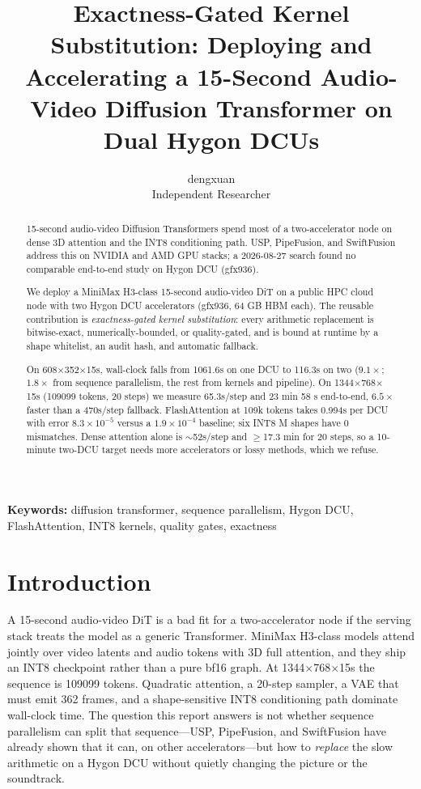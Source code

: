 \documentclass[11pt]{article}
\title{Exactness-Gated Kernel Substitution: Deploying and Accelerating a 15-Second Audio-Video Diffusion Transformer on Dual Hygon DCUs}
\author{dengxuan\\Independent Researcher}
\date{}
\begin{document}
\maketitle

\begin{abstract}
15-second audio-video Diffusion Transformers spend most of a two-accelerator node on dense 3D attention and the INT8 conditioning path. USP, PipeFusion, and SwiftFusion address this on NVIDIA and AMD GPU stacks; a 2026-08-27 search found no comparable end-to-end study on Hygon DCU (gfx936).

We deploy a MiniMax H3-class 15-second audio-video DiT on a public HPC cloud node with two Hygon DCU accelerators (gfx936, 64 GB HBM each). The reusable contribution is \emph{exactness-gated kernel substitution}: every arithmetic replacement is bitwise-exact, numerically-bounded, or quality-gated, and is bound at runtime by a shape whitelist, an audit hash, and automatic fallback.

On 608$\times$352$\times$15s, wall-clock falls from 1061.6s on one DCU to 116.3s on two ($9.1\times$; $1.8\times$ from sequence parallelism, the rest from kernels and pipeline). On 1344$\times$768$\times$15s (109099 tokens, 20 steps) we measure 65.3s/step and 23 min 58 s end-to-end, $6.5\times$ faster than a 470s/step fallback. FlashAttention at 109k tokens takes 0.994s per DCU with error $8.3\times 10^{-5}$ versus a $1.9\times 10^{-4}$ baseline; six INT8 M shapes have 0 mismatches. Dense attention alone is $\sim$52s/step and $\geq$17.3 min for 20 steps, so a 10-minute two-DCU target needs more accelerators or lossy methods, which we refuse.
\end{abstract}

\noindent\textbf{Keywords:} diffusion transformer, sequence parallelism, Hygon DCU, FlashAttention, INT8 kernels, quality gates, exactness

\section{Introduction}
\label{sec:intro}

A 15-second audio-video DiT is a bad fit for a two-accelerator node if the serving stack treats the model as a generic Transformer. MiniMax H3-class models attend jointly over video latents and audio tokens with 3D full attention, and they ship an INT8 checkpoint rather than a pure bf16 graph. At 1344$\times$768$\times$15s the sequence is 109099 tokens. Quadratic attention, a 20-step sampler, a VAE that must emit 362 frames, and a shape-sensitive INT8 conditioning path dominate wall-clock time. The question this report answers is not whether sequence parallelism can split that sequence---USP, PipeFusion, and SwiftFusion have already shown that it can, on other accelerators---but how to \emph{replace} the slow arithmetic on a Hygon DCU without quietly changing the picture or the soundtrack.
\end{document}

